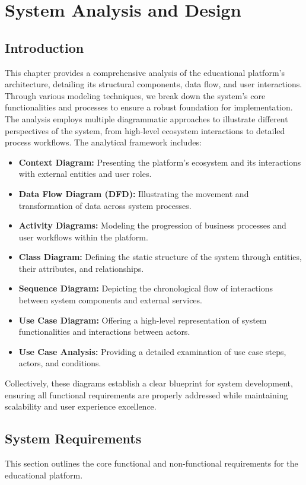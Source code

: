 \chapter{System Analysis and Design}
\label{chap:system_analysis}

\section{Introduction}
\label{sec:sys_intro}
This chapter provides a comprehensive analysis of the educational platform's architecture, detailing its structural components, data flow, and user interactions. Through various modeling techniques, we break down the system's core functionalities and processes to ensure a robust foundation for implementation. The analysis employs multiple diagrammatic approaches to illustrate different perspectives of the system, from high-level ecosystem interactions to detailed process workflows. The analytical framework includes:
\begin{itemize}
    \item \textbf{Context Diagram:} Presenting the platform's ecosystem and its interactions with external entities and user roles.
    \item \textbf{Data Flow Diagram (DFD):} Illustrating the movement and transformation of data across system processes.
    \item \textbf{Activity Diagrams:} Modeling the progression of business processes and user workflows within the platform.
    \item \textbf{Class Diagram:} Defining the static structure of the system through entities, their attributes, and relationships.
    \item \textbf{Sequence Diagram:} Depicting the chronological flow of interactions between system components and external services.
    \item \textbf{Use Case Diagram:} Offering a high-level representation of system functionalities and interactions between actors.
    \item \textbf{Use Case Analysis:} Providing a detailed examination of use case steps, actors, and conditions.
\end{itemize}
Collectively, these diagrams establish a clear blueprint for system development, ensuring all functional requirements are properly addressed while maintaining scalability and user experience excellence.

\section{System Requirements}
\label{sec:system_reqs}
This section outlines the core functional and non-functional requirements for the educational platform.

